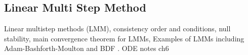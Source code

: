 \documentclass{article}
\theoremstyle{remark}
\begin{document}
\subsection{Linear Multi Step Method}%
\label{sub:linear_multi_step_method}

\begin{tcolorbox}
   Linear multistep methods (LMM), consistency order and conditions, null stability, main convergence theorem for LMMs, Examples of LMMs including Adam-Bashforth-Moulton and BDF	. ODE notes ch6
\end{tcolorbox}

 




\end{document}
